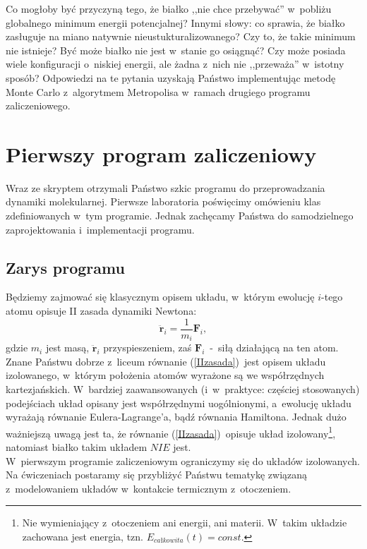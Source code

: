 \documentclass[a4paper,11pt,twoside]{book}
\begin{document}
Co mogłoby być przyczyną tego, że białko ,,nie chce przebywać'' w~pobliżu globalnego minimum energii potencjalnej? Innymi słowy: co sprawia, że białko zasługuje na miano natywnie nieustukturalizowanego? Czy to, że takie minimum nie istnieje? Być może białko nie jest w~stanie go osiągnąć? Czy może posiada wiele konfiguracji o~niskiej energii, ale żadna z~nich nie ,,przeważa'' w~istotny sposób? Odpowiedzi na te pytania uzyskają Państwo implementując metodę Monte Carlo z~algorytmem Metropolisa w~ramach drugiego programu zaliczeniowego.
\chapter{Pierwszy program zaliczeniowy}
Wraz ze skryptem otrzymali Państwo szkic programu do przeprowadzania dynamiki molekularnej. Pierwsze laboratoria poświęcimy omówieniu klas zdefiniowanych w~tym programie. Jednak zachęcamy Państwa do samodzielnego zaprojektowania i~implementacji programu.  
\section{Zarys programu}
Będziemy zajmować się klasycznym opisem układu, w~którym ewolucję $i$-tego atomu opisuje II zasada dynamiki Newtona:
\begin{equation}
\ddot{\mathbf{r}}_i = \frac{1}{m_i} \mathbf{F}_i,\label{IIzasada}
\end{equation}
gdzie $m_i$ jest masą, $\ddot{\mathbf{r}}_i$ przyspieszeniem, zaś $\mathbf{F}_i$~-~siłą działającą na ten atom.\\

Znane Państwu dobrze z~liceum równanie (\ref{IIzasada})~jest opisem układu izolowanego, w~którym położenia atomów wyrażone są we współrzędnych kartezjańskich. W~bardziej zaawansowanych (i~w~praktyce: częściej stosowanych) podejściach układ opisany jest współrzędnymi uogólnionymi, a~ewolucję układu wyrażają równanie Eulera-Lagrange'a, bądź równania Hamiltona. Jednak dużo ważniejszą uwagą jest ta, że równanie (\ref{IIzasada})~opisuje układ izolowany\footnote{Nie wymieniający z~otoczeniem ani energii, ani materii. W~takim układzie zachowana jest energia, tzn. $E_{całkowita}(t)=const$.}, natomiast białko takim układem $NIE$ jest.\\

W~pierwszym programie zaliczeniowym ograniczymy się do układów izolowanych. Na ćwiczeniach postaramy się przybliżyć Państwu tematykę związaną z~modelowaniem układów w~kontakcie termicznym z~otoczeniem.\\
\end{document}
